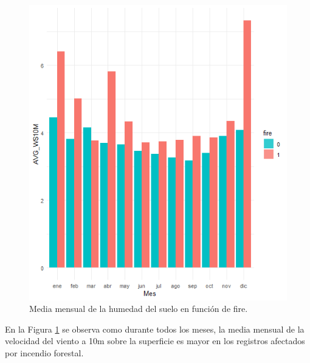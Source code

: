 \documentclass[12pt,a4paper,]{book}
\numberwithin{dummy}{section}
\theoremstyle{ocrenumbox}
\theoremstyle{blacknumex}
\theoremstyle{blacknumbox}
\theoremstyle{ocrenum}
\theoremstyle{ocrenum}
\begin{document}
\begin{figure}[h]
\centering
\includegraphics[width =\textwidth]{graficos/WS10M_mes.png}
\caption{Media mensual de la humedad del suelo en función de fire.}
\label{fig:WS10M_mes}
\end{figure}

En la Figura \ref{fig:WS10M_mes} se observa como durante todos los
meses, la media mensual de la velocidad del viento a 10m sobre la
superficie es mayor en los registros afectados por incendio forestal.
\end{document}
